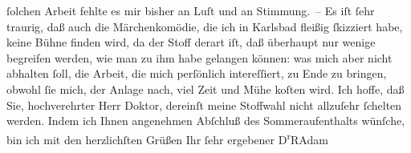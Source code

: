 \begin{ledgroupsized}[t]{13cm}
                    ſolchen Arbeit fehlte es mir bisher an Luſt und an Stimmung. –\pend
           \pstart
           Es iſt ſehr traurig, daß auch die Märchenkomödie, die ich in Karlsbad
                    fleißig ſkizziert habe, keine Bühne finden wird, da der Stoff derart iſt, daß
                    überhaupt nur wenige begreifen werden, wie man zu ihm habe gelangen können: was
                    mich aber nicht abhalten ſoll, die Arbeit, die mich perſönlich intereſſiert, {\pb}zu Ende zu bringen, obwohl ſie mich,
                    der Anlage nach, viel Zeit und Mühe koſten wird. Ich hoffe, daß Sie,
                    hochverehrter Herr Doktor, dereinſt meine Stoffwahl nicht allzuſehr ſchelten
                    werden.\pend
           \pstart
           Indem ich Ihnen angenehmen Abſchluß des Sommeraufenthalts wünſche, bin ich mit
                    den herzlichſten Grüßen Ihr ſehr ergebener\pend
           \pstart \spacefill\mbox{D\textsuperscript{r}RAdam}\pend{}
         
         \endnumbering{}\end{ledgroupsized}  \newcommand{\dateiname}{L02325}\newcommand{\titel}{Robert Adam an Arthur Schnitzler, 19. 8. 1919}\newcommand{\editorInnen}{Martin Anton Müller und Gerd-Hermann Susen}
      